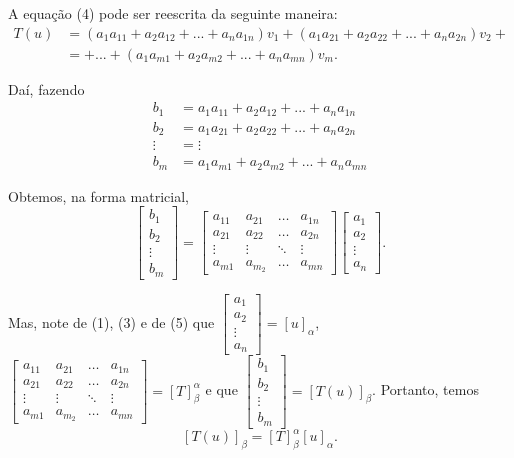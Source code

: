 A equação  (4) pode ser reescrita da seguinte maneira:
\begin{align}
T(u)&=(a_1a_{11}+a_2a_{12}+...+a_na_{1n})v_1+(a_1a_{21}+a_2a_{22}+...+a_na_{2n})v_2+ \nonumber\\
     &=+...+(a_1a_{m1}+a_2a_{m2}+...+a_na_{mn})v_m.
\end{align}

Daí, fazendo
\begin{align}
b_1&=a_1a_{11}+a_2a_{12}+...+a_na_{1n} \nonumber\\
b_2&=a_1a_{21}+a_2a_{22}+...+a_na_{2n} \nonumber\\
 \vdots& = \vdots \nonumber\\
b_m&=a_1a_{m1}+a_2a_{m2}+...+a_na_{mn}
\end{align}

Obtemos, na forma matricial,
$$\left[ \begin{array}{c} b_1\\ b_2 \\ \vdots \\ b_m \end{array} \right]=\left[ \begin{array}{cccc}a_{11} &a_{21} & \hdots & a_{1n} \\ a_{21} & a_{22} & \hdots & a_{2n} \\ \vdots & \vdots & \ddots & \vdots \\ a_{m1}& a_{m_2} & \hdots & a_{mn} \end{array} \right]\left[ \begin{array}{c} a_1\\ a_2 \\ \vdots \\ a_n \end{array} \right].$$

Mas, note de (1), (3) e de (5) que $\left[ \begin{array}{c} a_1\\ a_2 \\ \vdots \\ a_n \end{array} \right]=[u]_{\alpha}$, $\left[ \begin{array}{cccc}a_{11} &a_{21} & \hdots & a_{1n} \\ a_{21} & a_{22} & \hdots & a_{2n} \\ \vdots & \vdots & \ddots & \vdots \\ a_{m1}& a_{m_2} & \hdots & a_{mn} \end{array} \right]=[T]_{\beta}^{\alpha}$ e que  $\left[ \begin{array}{c} b_1\\ b_2 \\ \vdots \\ b_m \end{array} \right]=[T(u)]_{\beta}$. Portanto, temos $$ [T(u)]_{\beta}=[T]_{\beta}^{\alpha}[u]_{\alpha}.$$


